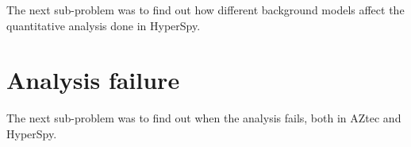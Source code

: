 The next sub-problem was to find out how different background models affect the quantitative analysis done in HyperSpy.

%
%
\section{Analysis failure}
\label{sec:results:failure}

The next sub-problem was to find out when the analysis fails, both in AZtec and HyperSpy.
